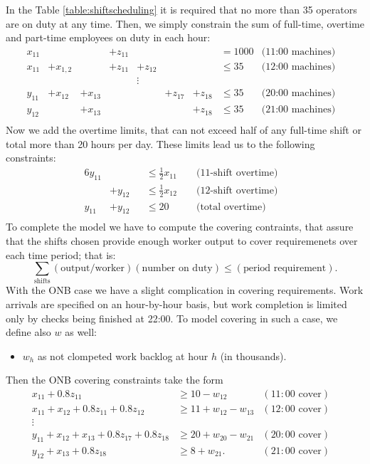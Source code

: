 \documentclass[a4paper,10 pt,titlepage,twoside]{book}
\theoremstyle{plain}
\theoremstyle{definition}
\theoremstyle{remark}
\begin{document}
In the Table \ref{table:shiftscheduling} it is required that no more than 35 operators are on duty at any time. Then, we simply constrain the sum of full-time, overtime and part-time employees on duty in each hour:
\begin{align*}
x_{11}&        &         &+z_{11}&        &&        &= 1000&\text{(11:00 machines)}&\\
x_{11}&+x_{1,2}&         &+z_{11}&+z_{12}&&        &\leq 35&\text{(12:00 machines)}&\\
&&&&\vdots&&&\\
y_{11}&+x_{12}&+x_{13}&         &&+z_{17}&+z_{18}&\leq35&\text{(20:00 machines)}&\\
y_{12}&        &+x_{13}&         &        &&+z_{18}&\leq35&\text{(21:00 machines)}&\\
\end{align*}
Now we add the overtime limits, that can not exceed half of any full-time shift or total more than 20 hours per day. These limits lead us to the following constraints:
\begin{alignat*}{6}
y_{11}&       &&\leq \frac{1}{2}x_{11}&&\text{         (11-shift overtime)}&\\
      &+y_{12}&&\leq \frac{1}{2}x_{12}&&\text{         (12-shift overtime)}&\\
y_{11}&+y_{12}&&\leq 20               &&\text{         (total overtime)}&\\
\end{alignat*}
To complete the model we have to compute the covering contraints, that assure that the shifts chosen provide enough worker output to cover requiremenets over each time period; that is:
\begin{equation*}
\sum\limits_{\text{shifts}}(\text{output/worker})(\text{number on duty})\leq(\text{period requirement}).
\end{equation*}		
With the ONB case we have a slight complication in covering requirements. Work arrivals are specified on an hour-by-hour basis, but work completion is limited only by checks being finished at 22:00. To model covering in such a case, we define also $w$ as well:
\begin{itemize}
	\item $w_{h}$ as not clompeted work backlog at hour $h$ (in thousands).
\end{itemize}
Then the ONB covering constraints take the form
\begin{align*}
x_{11}+0.8z_{11}&\geq 10 - w_{12}&(11:00 \text{ cover})&\\
x_{11}+x_{12}+0.8z_{11}+0.8z_{12}&\geq11 +w_{12}-w_{13}&(12:00 \text{ cover})&\\
\vdots&&&\\
y_{11}+x_{12}+x_{13}+0.8z_{17}+0.8z_{18}&\geq 20 +w_{20}-w_{21}&(20:00 \text{ cover})&\\
y_{12}+x_{13}+0.8z_{18}&\geq 8 +w_{21}.&(21:00 \text{ cover})&\\
\end{align*}
\end{document}
